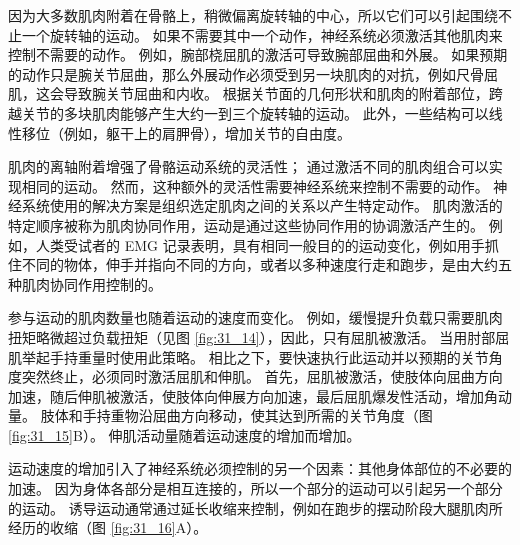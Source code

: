 因为大多数肌肉附着在骨骼上，稍微偏离旋转轴的中心，所以它们可以引起围绕不止一个旋转轴的运动。
如果不需要其中一个动作，神经系统必须激活其他肌肉来控制不需要的动作。
例如，腕部桡屈肌的激活可导致腕部屈曲和外展。
如果预期的动作只是腕关节屈曲，那么外展动作必须受到另一块肌肉的对抗，例如尺骨屈肌，这会导致腕关节屈曲和内收。
根据关节面的几何形状和肌肉的附着部位，跨越关节的多块肌肉能够产生大约一到三个旋转轴的运动。
此外，一些结构可以线性移位（例如，躯干上的肩胛骨），增加关节的自由度。

肌肉的离轴附着增强了骨骼运动系统的灵活性； 通过激活不同的肌肉组合可以实现相同的运动。 然而，这种额外的灵活性需要神经系统来控制不需要的动作。 神经系统使用的解决方案是组织选定肌肉之间的关系以产生特定动作。 肌肉激活的特定顺序被称为肌肉协同作用，运动是通过这些协同作用的协调激活产生的。 例如，人类受试者的 EMG 记录表明，具有相同一般目的的运动变化，例如用手抓住不同的物体，伸手并指向不同的方向，或者以多种速度行走和跑步，是由大约五种肌肉协同作用控制的。

参与运动的肌肉数量也随着运动的速度而变化。 例如，缓慢提升负载只需要肌肉扭矩略微超过负载扭矩（见图 \ref{fig:31_14}），因此，只有屈肌被激活。 当用肘部屈肌举起手持重量时使用此策略。 相比之下，要快速执行此运动并以预期的关节角度突然终止，必须同时激活屈肌和伸肌。 首先，屈肌被激活，使肢体向屈曲方向加速，随后伸肌被激活，使肢体向伸展方向加速，最后屈肌爆发性活动，增加角动量。 
肢体和手持重物沿屈曲方向移动，使其达到所需的关节角度（图 \ref{fig:31_15}B）。 
伸肌活动量随着运动速度的增加而增加。

运动速度的增加引入了神经系统必须控制的另一个因素：其他身体部位的不必要的加速。 因为身体各部分是相互连接的，所以一个部分的运动可以引起另一个部分的运动。 
诱导运动通常通过延长收缩来控制，例如在跑步的摆动阶段大腿肌肉所经历的收缩（图 \ref{fig:31_16}A）。

